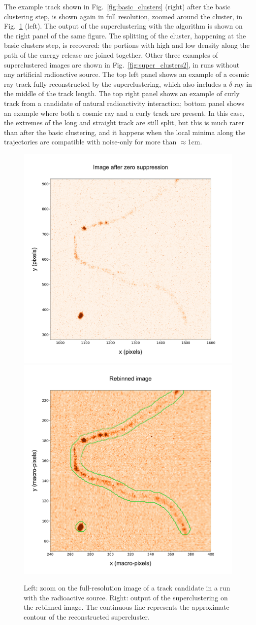 The example track shown in Fig.~\ref{fig:basic_clusters} (right) after
the basic clustering step, is shown again in full resolution, zoomed
around the cluster, in Fig.~\ref{fig:super_clusters1} (left). The
output of the superclustering with the \gac algorithm is shown on the
right panel of the same figure. The splitting of the cluster,
happening at the basic clusters step, is recovered: the portions with
high and low density along the path of the energy release are joined
together. Other three examples of superclustered images are shown in
Fig.~\ref{fig:super_clusters2}, in runs without any artificial
radioactive source. The top left panel shows an example of a cosmic
ray track fully reconstructed by the \gac superclustering, which also
includes a $\delta$-ray in the middle of the track length. The top
right panel shows an example of curly track from a candidate of
natural radioactivity interaction; bottom panel shows an example where
both a cosmic ray and a curly track are present. In this case, the
extremes of the long and straight track are still split, but this is
much rarer than after the basic clustering, and it happens when the
local minima along the trajectories are compatible with noise-only
for more than $\approx$1\unit{cm}.
%
\begin{figure}[ht]
  \begin{center}
     \includegraphics[width=0.49\linewidth]{figures/pic_run02317_ev8_oriIma_paper_zoom}
      \includegraphics[width=0.49\linewidth]{figures/pic_run02317_ev8_sc_3D_paper}
      \caption{Left: zoom on the full-resolution image of a track
        candidate in a run with the \ambe radioactive source. Right:
        output of the superclustering on the rebinned image. The
        continuous line represents the approximate contour of the
        reconstructed supercluster. \label{fig:super_clusters1}}
  \end{center}
\end{figure}
